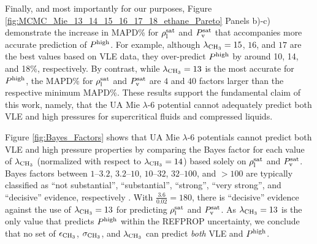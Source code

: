 \documentclass[preprint,letterpaper,floatfix,citeautoscript,aip,jcp]{revtex4-1}
\begin{document}
Finally, and most importantly for our purposes, Figure \ref{fig:MCMC_Mie_13_14_15_16_17_18_ethane_Pareto} Panels b)-c) demonstrate the 
increase in MAPD\% for $\rho_{\rm l}^{\rm sat}$ and $P_{\rm v}^{\rm sat}$ that accompanies more accurate prediction of $P^{\rm high}$. For example, although $\lambda_{\rm CH_3} = 15$, $16$, and $17$ are the best values based on VLE data, they over-predict $P^{\rm high}$ by around 10, 14, and 18\%, respectively. By contrast, while $\lambda_{\rm CH_3} = 13$ is the most accurate for $P^{\rm high}$, the MAPD\% for $\rho_{\rm l}^{\rm sat}$ and $P_{\rm v}^{\rm sat}$ are $4$ and $40$ factors larger than the respective minimum MAPD\%. These results support the fundamental claim of this work, namely, that the UA Mie $\lambda$-6 potential cannot adequately predict both VLE and high pressures for supercritical fluids and compressed liquids. 

Figure \ref{fig:Bayes_Factors} shows that UA Mie $\lambda$-6 potentials cannot predict both VLE and high pressure properties by comparing the Bayes factor for each value of $\lambda_{\rm CH_3}$ (normalized with respect to $\lambda_{\rm CH_3} = 14$) based solely on $\rho_{\rm l}^{\rm sat}$ and $P_{\rm v}^{\rm sat}$. Bayes factors between $1$--$3.2$, $3.2$--$10$, $10$--$32$, $32$--$100$, and $>100$ are typically classified as ``not substantial'', ``substantial'', ``strong'', ``very strong'', and ``decisive'' evidence, respectively \cite{Jeffreys2004}. With $\frac{3.6}{0.02} = 180$, there is ``decisive'' evidence against the use of $\lambda_{\rm CH_3} = 13$ for predicting $\rho_{\rm l}^{\rm sat}$ and $P_{\rm v}^{\rm sat}$. As $\lambda_{\rm CH_3} = 13$ is the only value that predicts $P^{\rm high}$ within the REFPROP uncertainty, we conclude that no set of $\epsilon_{\rm CH_3}$, $\sigma_{\rm CH_3}$, and $\lambda_{\rm CH_3}$ can predict \textit{both} VLE and $P^{\rm high}$. 


%
%
\end{document}
